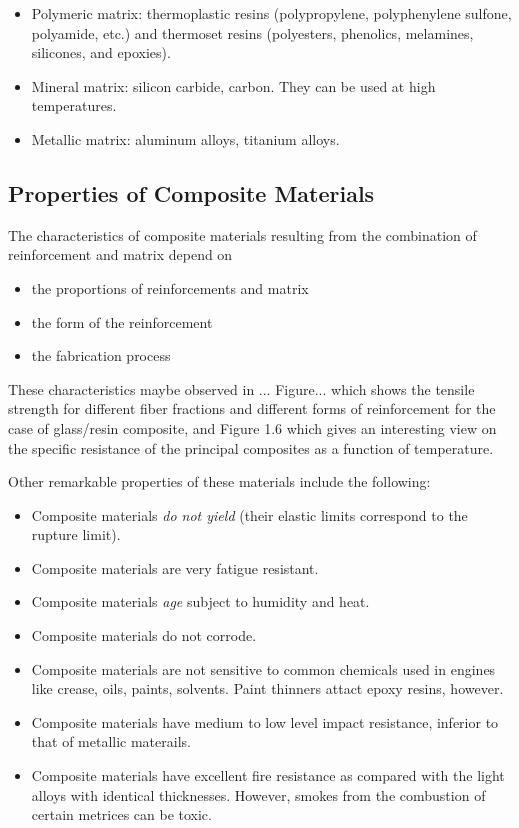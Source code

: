 \documentclass[
10pt,
a4paper,
openany,
svgnames,
]{book}
\begin{document}
\begin{itemize}
\item Polymeric matrix: thermoplastic resins (polypropylene, polyphenylene sulfone, polyamide, etc.) and thermoset resins (polyesters, phenolics, melamines, silicones, and epoxies).
\item Mineral matrix: silicon carbide, carbon. They can be used at high temperatures.
\item Metallic matrix: aluminum alloys, titanium alloys.
\end{itemize}

\subsection{Properties of Composite Materials}

The characteristics of composite materials resulting from the combination of reinforcement and matrix depend on

\begin{itemize}
\item the proportions of reinforcements and matrix
\item the form of the reinforcement
\item the fabrication process
\end{itemize}

These characteristics maybe observed in ... {\color{Red}Figure...} which shows the tensile strength for different fiber fractions and different forms of reinforcement for the case of glass/resin composite, and {\color{Red}Figure 1.6} which gives an interesting view on the specific resistance of the principal composites as a function of temperature.

Other remarkable properties of these materials include the following:

\begin{itemize}
\item Composite materials \emph{do not yield} (their elastic limits correspond to the rupture limit).
\item Composite materials are very fatigue resistant.
\item Composite materials \emph{age} subject to humidity and heat.
\item Composite materials do not corrode.
\item Composite materials are not sensitive to common chemicals used in engines like crease, oils, paints, solvents. Paint thinners attact epoxy resins, however.
\item Composite materials have medium to low level impact resistance, inferior to that of metallic materails.
\item Composite materials have excellent fire resistance as compared with the light alloys with identical thicknesses. However, smokes from the combustion of certain metrices can be toxic.
\end{itemize}
\end{document}

